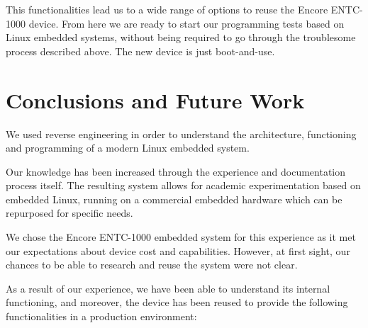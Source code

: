 \documentclass[conference]{IEEEtran}
\newcommand{\nota}[1]{}
\begin{document}
This functionalities lead us to a wide range of options to
reuse the Encore ENTC-1000 device. From here we are
ready to start our programming tests based on Linux embedded
systems, without being required to go through the troublesome
process described above. The new device is just boot-and-use.








\section{Conclusions and Future Work}

\nota{Se utilizó ingeniería inversa para entender la arquitectura, funcionamiento
y la programación de un sistema Linux embebido moderno.

La experiencia y documentación del proceso
nos permitió obtener mayor conocimiento del tema,
posibilitó la experimentación académica con Linux embebido, y
permitió el reuso de un sistema embebido comercial para necesidades
específicas.}

We used reverse engineering in order to understand the architecture, 
functioning and programming of a modern Linux embedded system.

Our knowledge has been increased through the experience and
documentation process itself. The resulting system allows for academic 
experimentation based on embedded Linux, running on a commercial 
embedded hardware which can be repurposed for specific needs. 

\nota{
Se seleccionó el hardware Encore ENTC-1000 porque cubre
las expectativas de prestaciones, aún cuando no se conocía,
en un primer momento, si sería posible estudiarlo y reutilizarlo.

Afortunadamente, y luego de esta experiencia, no sólo
se ha logrado entender el funcionamiento interno, sino que
tambien, se está reutilizando de manera productiva para
cumplir disintos roles :
}
We chose the Encore ENTC-1000 embedded system for this experience
as it met our expectations about device cost and capabilities. However, at first sight, our chances to be able to research and reuse the system were not clear.

As a result of our experience, we have been able to 
understand its internal functioning, and moreover, the device 
has been reused to provide the following functionalities in a 
production environment: 
\end{document}
